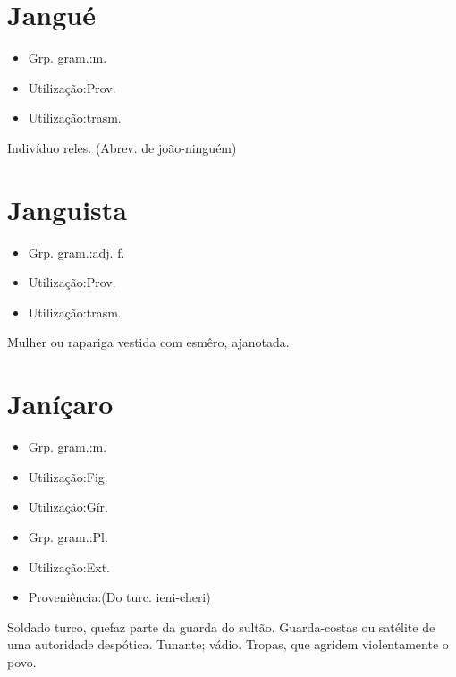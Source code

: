 \documentclass{article}
\begin{document}
\section{Jangué}
\begin{itemize}
\item {Grp. gram.:m.}
\end{itemize}
\begin{itemize}
\item {Utilização:Prov.}
\end{itemize}
\begin{itemize}
\item {Utilização:trasm.}
\end{itemize}
Indivíduo reles.
(Abrev. de \textunderscore joão-ninguém\textunderscore )
\section{Janguista}
\begin{itemize}
\item {Grp. gram.:adj. f.}
\end{itemize}
\begin{itemize}
\item {Utilização:Prov.}
\end{itemize}
\begin{itemize}
\item {Utilização:trasm.}
\end{itemize}
Mulher ou rapariga vestida com esmêro, ajanotada.
\section{Janíçaro}
\begin{itemize}
\item {Grp. gram.:m.}
\end{itemize}
\begin{itemize}
\item {Utilização:Fig.}
\end{itemize}
\begin{itemize}
\item {Utilização:Gír.}
\end{itemize}
\begin{itemize}
\item {Grp. gram.:Pl.}
\end{itemize}
\begin{itemize}
\item {Utilização:Ext.}
\end{itemize}
\begin{itemize}
\item {Proveniência:(Do turc. \textunderscore ieni-cheri\textunderscore )}
\end{itemize}
Soldado turco, quefaz parte da guarda do sultão.
Guarda-costas ou satélite de uma autoridade despótica.
Tunante; vádio.
Tropas, que agridem violentamente o povo.
\end{document}
